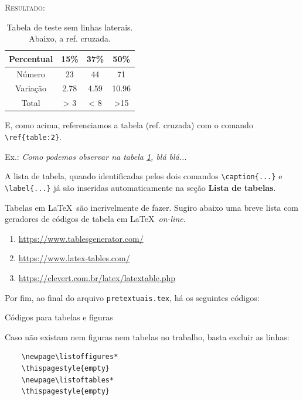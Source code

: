 \documentclass[a4paper,12pt,oneside,openright,extrafontsizes,openbib]{memoir}
\begin{document}
{\textsc{Resultado:}

\begin{table}[h!]
	\begin{center}
		\begin{tabular}{c|c|c|c}
			\hline
			Percentual & 15\% & 37\% & 50\% \\
			\hline
			Número & 23 & 44 & 71 \\
			\hline
			Variação & 2.78 & 4.59 & 10.96 \\
			\hline
			Total & > 3 & < 8 & >15  \\
			\hline
		\end{tabular}
		\caption{Tabela de teste sem linhas laterais. Abaixo, a ref. cruzada.}
		\label{table:2}
	\end{center}
\end{table}

E, como acima, referenciamos a tabela (ref. cruzada) com o comando \verb|\ref{table:2}|.

Ex.: \textit{Como podemos observar na tabela \ref{table:2}, blá blá...}

A lista de tabela, quando identificadas pelos dois comandos \verb|\caption{...}| e \verb|\label{...}| já são inseridas automaticamente na seção \textbf{Lista de tabelas}.

Tabelas em \LaTeX\ são incrivelmente  de fazer. Sugiro abaixo uma breve lista com geradores de códigos de tabela em \LaTeX\ \textit{on-line}.

\begin{enumerate}
	\item \url{https://www.tablesgenerator.com/}
	\item \url{https://www.latex-tables.com/}
	\item \url{https://clevert.com.br/latex/latextable.php}
\end{enumerate}

Por fim, ao final do arquivo \verb|pretextuais.tex|, há os seguintes códigos:

\begin{codex}{Códigos para tabelas e figuras}
	\newpage\tableofcontents*
	\thispagestyle{empty}
	\newpage\listoffigures*
	\thispagestyle{empty}
	\newpage\listoftables*
	\thispagestyle{empty}
\end{codex}

Caso não existam nem figuras nem tabelas no trabalho, basta excluir as linhas: 
\begin{verbatim} 
	\newpage\listoffigures*
	\thispagestyle{empty}
	\newpage\listoftables*
	\thispagestyle{empty} 
\end{verbatim}

}
\end{document}

